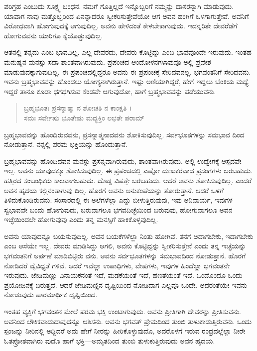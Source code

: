 ಪರಿಗ್ರಹ ಎಂಬುದು ಸೂಕ್ಷ್ಮ ಬಂಧನ. ನಮಗೆ ಗೊತ್ತಿಲ್ಲದೆ ಇನ್ನೊಬ್ಬರಿಗೆ ನಮ್ಮನ್ನು ದಾಸರನ್ನಾಗಿ ಮಾಡುವುದು. ಯಾವಾಗ ನಾವು ಮತ್ತೊಬ್ಬರಿಂದ ಏನನ್ನಾದರೂ ಸ್ವೀಕರಿಸುತ್ತೇವೆಯೋ ಆಗ ಅವನ ಹಂಗಿಗೆ ಒಳಗಾಗುತ್ತೇವೆ. ಅವನಿಗೆ ವಿರೋಧವಾಗಿ ಹೋಗುವುದಕ್ಕೆ ಆಗುವುದಿಲ್ಲ. ಅವನು ಹೇಳಿದಂತೆ ಕೇಳಬೇಕಾಗುವುದು. ಇದನ್ನರಿತೇ ದೇವರೆಡೆಗೆ ಹೋಗುವವನು ಯಾರಿಗೂ ಕೈಯೊಡ್ಡುವುದಿಲ್ಲ.

ಆತನಲ್ಲಿ ತನ್ನದು ಎಂಬ ಭಾವವಿಲ್ಲ. ಎಲ್ಲ ದೇವರದು, ದೇವರು ಕೊಟ್ಟಿದ್ದು ಎಂಬ ಭಾವವೊಂದೇ ಇರುವುದು. ಇಂತಹ ಮನುಷ್ಯನ ಮನಸ್ಸು ಸದಾ ಶಾಂತವಾಗಿರುವುದು. ಪ್ರಪಂಚದ ಆಂದೋಳನಗಳಾವುವೂ ಅಲ್ಲಿ ಪ್ರವೇಶ ಮಾಡುವುದಕ್ಕಾಗುವುದಿಲ್ಲ. ಈ ಪ್ರಪಂಚದಲ್ಲಿದ್ದರೂ ಅವನು ಈ ಪ್ರಪಂಚಕ್ಕೆ ಸೇರಿದವನಲ್ಲ, ಭಗವಂತನಿಗೆ ಸೇರಿದವನು. ಇವನು ಬ್ರಹ್ಮಭಾವವನ್ನು ಹೊಂದಲು ಯೋಗ್ಯನಾಗಿರುತ್ತಾನೆ. ಇಷ್ಟು ಅಣಿಯಾಗಿದ್ದರೆ, ಹೇಗೆ ಇದ್ದಲು ಬೆಂಕಿಯ ಮಧ್ಯೆ ಇದ್ದರೆ ತಾನೂ ಕೂಡಾ ಧಗಧಗಿಸುವ ಕೆಂಡವೇ ಆಗುವುದೋ, ಹಾಗೆ ಬ್ರಹ್ಮಭಾವವನ್ನು ಪಡೆಯುವನು.

\begin{verse}
ಬ್ರಹ್ಮಭೂತಃ ಪ್ರಸನ್ನಾತ್ಮಾ ನ ಶೋಚತಿ ನ ಕಾಂಕ್ಷತಿ ।\\ಸಮಃ ಸರ್ವೇಷು ಭೂತೇಷು ಮದ್ಭಕ್ತಿಂ ಲಭತೇ ಪರಾಮ್ 
\end{verse}

{\small ಬ್ರಹ್ಮಭಾವವನ್ನು ಹೊಂದಿರುವವನು, ಪ್ರಸನ್ನಾತ್ಮನಾದವನು ಶೋಕಿಸುವುದಿಲ್ಲ. ಸರ್ವಭೂತಗಳನ್ನು ಸಮಭಾವ ದಿಂದ ನೋಡುತ್ತಾನೆ. ನನ್ನಲ್ಲಿ ಪರಮ ಭಕ್ತಿಯನ್ನು ಹೊಂದುತ್ತಾನೆ.}

ಬ್ರಹ್ಮಭಾವವನ್ನು ಹೊಂದಿದವನ ಮನಸ್ಸು ಪ್ರಸನ್ನವಾಗಿರುವುದು, ಶಾಂತವಾಗಿರುವುದು. ಅಲ್ಲಿ ಉದ್ವೇಗಕ್ಕೆ ಆಸ್ಪದವೇ ಇಲ್ಲ. ಅವನು ಯಾವುದಕ್ಕೂ ಶೋಕಿಸುವುದಿಲ್ಲ. ಈ ಪ್ರಪಂಚದಲ್ಲಿ ಎಷ್ಟೋ ದುಃಖಕರವಾದ ಪ್ರಸಂಗಗಳು ಬರಬಹುದು. ಹತ್ತಿರದ ಸಂಬಂಧಿಕರು ಕಾಲವಾಗಬಹುದು. ದೊಡ್ಡ ವಿಪತ್ತೇ ಬರಬಹುದು. ಆದರೆ ಅವನು ಶೋಕಿಸುವುದಿಲ್ಲ. ಎಂದರೆ ಅವನ ಹೃದಯ ಕಲ್ಲಿನಂತಾಗುವು ದಿಲ್ಲ. ಹೊರಗೆ ಅವನು ಅನುಕಂಪೆಯನ್ನು ತೋರುತ್ತಾನೆ. ಆದರೆ ಒಳಗೆ ತಿಳಿದುಕೊಂಡಿರುವನು: ಸಂಸಾರದಲ್ಲಿ ಈ ಅಲೆಗಳೆಲ್ಲಾ ಎದ್ದು ಬೀಳುತ್ತಿರುವುವು, ಇವು ಅನಿವಾರ್ಯ, ಇವುಗಳ ಸ್ವಭಾವವೇ ಬಂದು ಹೋಗುವುದು, ಬರುವಾಗಲೂ ಭಗವದಿಚ್ಛೆಯಿಂದ ಬರುವುವು, ಹೋಗುವಾಗಲೂ ಅವನ ಇಚ್ಛೆಯಿಂದಲೇ ಹೋಗುವುವು ಎಂದು ತನ್ನ ಮನಸ್ಸಿಗೆ ಹಾಕಿಕೊಳ್ಳವುದಿಲ್ಲ.

ಅವನು ಯಾವುದನ್ನೂ ಬಯಸುವುದಿಲ್ಲ. ಅವನ ಬಯಕೆಗಳೆಲ್ಲಾ ನಿಂತು ಹೋಗಿವೆ. ತನಗೆ ಅದಾಗಬೇಕು, ಇದಾಗಬೇಕು ಎಂಬ ಆಸೆಯೇ ಇಲ್ಲ. ದೇವರು ಮಾಡಿಸಿದ್ದು ಆಗಲಿ, ಅವನು ಕೊಟ್ಟಿದ್ದನ್ನು ಸ್ವೀಕರಿಸುತ್ತೇನೆ ಎಂದು ತನ್ನ ಇಚ್ಛೆಯನ್ನು ಭಗವಂತನಿಗೆ ಅರ್ಪಣೆ ಮಾಡಿಬಿಟ್ಟಿರು ವನು. ಅವನು ಸರ್ವಭೂತಗಳನ್ನು ಸಮಭಾವದಿಂದ ನೋಡುತ್ತಾನೆ. ಹೊರಗೆ ನೋಡಿದರೆ ವೈವಿಧ್ಯತೆ ಗಳಿವೆ. ಆದರೆ ಇವೆಲ್ಲಾ ಉಪಾಧಿಗಳು, ವೇಷಗಳು, ಇವುಗಳ ಹಿಂದೆಲ್ಲಾ ಭಗವಂತನೇ ಇರುವುದು. ಜೇಡಿಮಣ್ಣು ವಿನಾಯಕನಂತೆ ಇದೆ, ಮಡಕೆಯಂತೆ ಇದೆ, ಹಣತೆಯಂತೆ ಇದೆ. ಒಂದೊಂದೂ ಒಂದು ಪ್ರಯೋಜನಕ್ಕೆ ಬರುತ್ತದೆ. ಆದರೆ ಜೇಡಿಮಣ್ಣಿನ ದೃಷ್ಟಿಯಿಂದ ನೋಡಿದಾಗ ಎಲ್ಲವೂ ಒಂದೇ. ಅದರಂತೆಯೇ ಇವನು ನೋಡುವುದು ಪಾರಮಾರ್ಥಿಕ ದೃಷ್ಟಿಯಿಂದ.

ಇಂತಹ ವ್ಯಕ್ತಿಗೆ ಭಗವಂತನ ಮೇಲೆ ಪರಮ ಭಕ್ತಿ ಉಂಟಾಗುವುದು. ಅವನು ಪ್ರೀತಿಗಾಗಿ ದೇವರನ್ನು ಪ್ರೀತಿಸುವನು. ಅವನಿಂದ ಲೌಕಿಕವಾದುದಾವುದನ್ನೂ ಆಶಿಸನು. ಅವನು ಭಗವತ್ ಪ್ರೇಮದಿಂದ ತುಂಬಿ ತುಳುಕಾಡುತ್ತಿರುವನು. ಒಂದು ಸ್ಪಂಜನ್ನು ನೀರಿನಲ್ಲಿ ಅದ್ದಿದರೆ ಅದು ಹೇಗೆ ನೀರನ್ನು ಹೀರಿಕೊಳ್ಳುವುದೊ, ಅದರೊಳಗೆ ಇರುವ ರಂಧ್ರದಲ್ಲೆಲ್ಲಾ ನೀರೇ ಓತಪ್ರೋತವಾಗಿರು ವುದೊ ಹಾಗೆ ಭಕ್ತಿ—ಅಮೃತದಿಂದ ತುಂಬಿ ತುಳುಕುತ್ತಿರುವುದು ಅವನ ಹೃದಯ.

